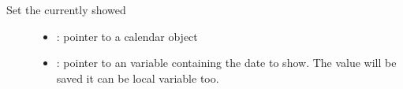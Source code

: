 \documentclass[letterpaper,10pt,english]{sphinxmanual}
\begin{document}
\begin{fulllineitems}
\label{\detokenize{object-types/calendar:_CPPv427lv_calendar_set_showed_dateP8lv_obj_tP18lv_calendar_date_t}}%
\pysigstartmultiline
{}\label{\detokenize{object-types/calendar:lv__calendar_8h_1a5f4bb22101f8bde3ae457c88563b9f9c}}%
\pysigstopmultiline
Set the currently showed \begin{description}
\item[{}] \leavevmode\begin{itemize}
\item {} 
: pointer to a calendar object 

\item {} 
: pointer to an  variable containing the date to show. The value will be saved it can be local variable too. 

\end{itemize}

\end{description}


\end{fulllineitems}

\end{document}

